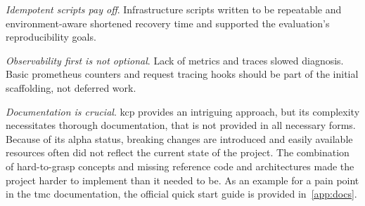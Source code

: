 \documentclass[11pt, a4paper, oneside, listof=totoc]{scrartcl}
\begin{document}
\begin{enumerate}[label={[\arabic*]:},
                ref=Challenge~\arabic*,
                leftmargin=*,
                itemsep=0.6\baselineskip]
                \item\label{chal:evalLessonsIdempotentScripts}
                    \textit{Idempotent scripts pay off}.
                    Infrastructure scripts written to be repeatable and environment-aware shortened
                    recovery time and supported the evaluation's reproducibility goals.
                
                \item\label{chal:evalLessonsObservabilityFirst}
                    \textit{Observability first is not optional}.
                    Lack of metrics and traces slowed diagnosis.
                    Basic \gls{prometheus} counters and request tracing hooks should be part of the
                    initial scaffolding, not deferred work.

                \item\label{chal:evalLessonsDocumentation}
                    \textit{Documentation is crucial}.
                    \gls{kcp} provides an intriguing approach, but its complexity necessitates
                    thorough documentation, that is not provided in all necessary forms.
                    Because of its alpha status, breaking changes are introduced and easily available
                    resources often did not reflect the current state of the project.
                    The combination of hard-to-grasp concepts and missing reference code and
                    architectures made the project harder to implement than it needed to be.
                    As an example for a pain point in the \gls{tmc} documentation, the official
                    quick start guide is provided in~\autoref{app:docs}.
            \end{enumerate}

        
\end{document}

